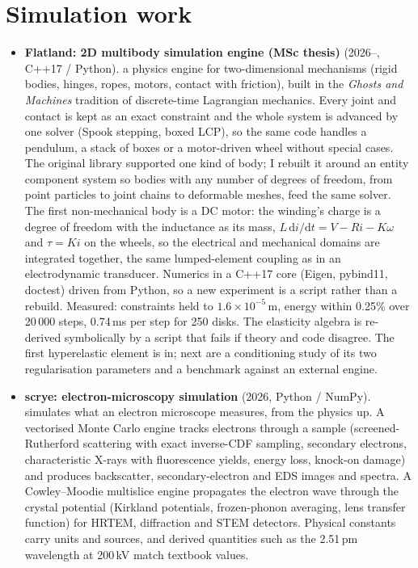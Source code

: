 \documentclass[10pt,a4paper]{article}
\newcommand{\proj}[3]{\item \textbf{#1} \textcolor{muted}{(#2).} #3}
\begin{document}
\section{Simulation work}
\begin{itemize}
\proj{Flatland: 2D multibody simulation engine (MSc thesis)}{2026--, C++17 / Python}{a physics engine for two-dimensional mechanisms (rigid bodies, hinges, ropes, motors, contact with friction), built in the \emph{Ghosts and Machines} tradition of discrete-time Lagrangian mechanics. Every joint and contact is kept as an exact constraint and the whole system is advanced by one solver (Spook stepping, boxed LCP), so the same code handles a pendulum, a stack of boxes or a motor-driven wheel without special cases. The original library supported one kind of body; I rebuilt it around an entity component system so bodies with any number of degrees of freedom, from point particles to joint chains to deformable meshes, feed the same solver. The first non-mechanical body is a DC motor: the winding's charge is a degree of freedom with the inductance as its mass, $L\,\mathrm{d}i/\mathrm{d}t = V - Ri - K\omega$ and $\tau = Ki$ on the wheels, so the electrical and mechanical domains are integrated together, the same lumped-element coupling as in an electrodynamic transducer. Numerics in a C++17 core (Eigen, pybind11, doctest) driven from Python, so a new experiment is a script rather than a rebuild. Measured: constraints held to $1.6\times10^{-5}$\,m, energy within 0.25\% over 20\,000 steps, 0.74\,ms per step for 250 disks. The elasticity algebra is re-derived symbolically by a script that fails if theory and code disagree. The first hyperelastic element is in; next are a conditioning study of its two regularisation parameters and a benchmark against an external engine.}
\proj{scrye: electron-microscopy simulation}{2026, Python / NumPy}{simulates what an electron microscope measures, from the physics up. A vectorised Monte Carlo engine tracks electrons through a sample (screened-Rutherford scattering with exact inverse-CDF sampling, secondary electrons, characteristic X-rays with fluorescence yields, energy loss, knock-on damage) and produces backscatter, secondary-electron and EDS images and spectra. A Cowley--Moodie multislice engine propagates the electron wave through the crystal potential (Kirkland potentials, frozen-phonon averaging, lens transfer function) for HRTEM, diffraction and STEM detectors. Physical constants carry units and sources, and derived quantities such as the 2.51\,pm wavelength at 200\,kV match textbook values.}

\end{itemize}
\end{document}
